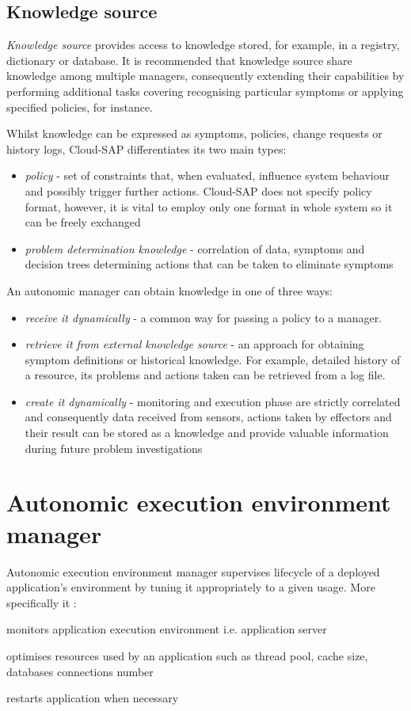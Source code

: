 \subsection{Knowledge source}
\emph{Knowledge source} provides access to knowledge stored, for example, in a registry, dictionary or database. It is recommended that knowledge source share knowledge among multiple managers, consequently extending their capabilities by performing additional tasks covering recognising particular symptoms or applying specified policies, for instance.


Whilst knowledge can be expressed as symptoms, policies, change requests or history logs, Cloud-SAP differentiates its two main types:
\begin{itemize}
 \item \emph{policy} - set of constraints that, when evaluated, influence system behaviour and possibly trigger further actions. Cloud-SAP does not specify policy format, however, it is vital to employ only one format in whole system so it can be freely exchanged
 \item \emph{problem determination knowledge} - correlation of data, symptoms and decision trees determining actions that can be taken to eliminate symptoms
\end{itemize}

An autonomic manager can obtain knowledge in one of three ways:
\begin{itemize}
 \item \emph{receive it dynamically} - a common way for passing a policy to a manager. 
 \item \emph{retrieve it from external knowledge source} - an approach for obtaining symptom definitions or historical knowledge. For example, detailed history of a resource, its problems and actions taken can be retrieved from a log file.
 \item \emph{create it dynamically} - monitoring and execution phase are strictly correlated and consequently data received from sensors, actions taken by effectors and their result can be stored as a knowledge and provide valuable information during future problem investigations
\end{itemize}


\section{Autonomic execution environment manager}
Autonomic execution environment manager supervises lifecycle of a deployed application's environment by tuning it appropriately to a given usage. More specifically it :
\begin{inparaenum}[1)]
 \item monitors application execution environment i.e. application server
 \item optimises resources used by an application such as thread pool, cache size, databases connections number
 \item restarts application when necessary
\end{inparaenum}

